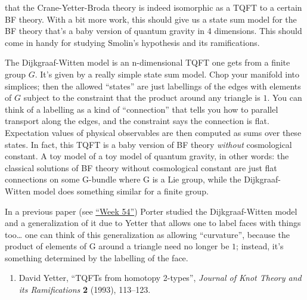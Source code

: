 \documentclass{article}
\def\tightlist{}
\renewcommand{\texttt}[1]{%
  \begingroup
  \ttfamily
  \begingroup\lccode`~=`/\lowercase{\endgroup\def~}{/\discretionary{}{}{}}%
  \begingroup\lccode`~=`[\lowercase{\endgroup\def~}{[\discretionary{}{}{}}%
  \begingroup\lccode`~=`.\lowercase{\endgroup\def~}{.\discretionary{}{}{}}%
  \catcode`/=\active\catcode`[=\active\catcode`.=\active
  \scantokens{#1\noexpand}%
  \endgroup
}
\begin{document}
that the Crane-Yetter-Broda theory is indeed isomorphic as a TQFT to a
certain BF theory. With a bit more work, this should give us a state sum
model for the BF theory that's a baby version of quantum gravity in 4
dimensions. This should come in handy for studying Smolin's hypothesis
and its ramifications.


The Dijkgraaf-Witten model is an n-dimensional TQFT one gets from a
finite group \(G\). It's given by a really simple state sum model. Chop
your manifold into simplices; then the allowed ``states'' are just
labellings of the edges with elements of \(G\) subject to the constraint
that the product around any triangle is \(1\). You can think of a
labelling as a kind of ``connection'' that tells you how to parallel
transport along the edges, and the constraint says the connection is
flat. Expectation values of physical observables are then computed as
sums over these states. In fact, this TQFT is a baby version of BF
theory \emph{without} cosmological constant. A toy model of a toy model
of quantum gravity, in other words: the classical solutions of BF theory
without cosmological constant are just flat connections on some G-bundle
where G is a Lie group, while the Dijkgraaf-Witten model does something
similar for a finite group.

In a previous paper (see \protect\hyperlink{week54}{``Week 54''}) Porter
studied the Dijkgraaf-Witten model and a generalization of it due to
Yetter that allows one to label faces with things too\ldots{} one can
think of this generalization as allowing ``curvature'', because the
product of elements of G around a triangle need no longer be \(1\);
instead, it's something determined by the labelling of the face.

\begin{enumerate}
\def\labelenumi{\arabic{enumi})}
\setcounter{enumi}{6}
\tightlist
\item
  David Yetter, ``TQFTs from homotopy 2-types'', \emph{Journal of Knot
  Theory and its Ramifications} \textbf{2} (1993), 113--123.
\end{enumerate}
\end{document}
